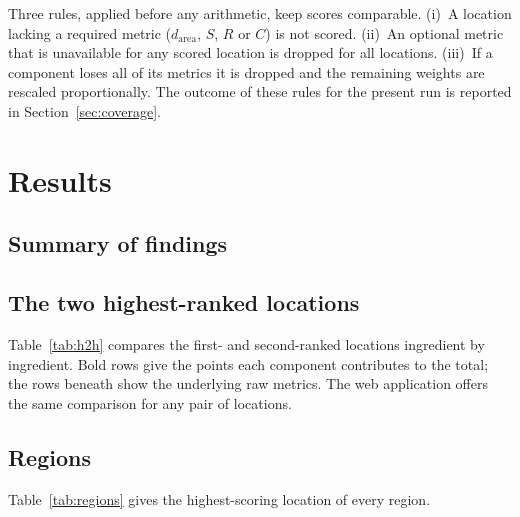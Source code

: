 \documentclass[11pt,a4paper]{article}
\begin{document}
Three rules, applied before any arithmetic, keep scores comparable. (i)~A location lacking a required
metric ($d_{\text{area}}$, $S$, $R$ or $C$) is not scored. (ii)~An optional metric that is unavailable for
any scored location is dropped for all locations. (iii)~If a component loses all of its metrics it is
dropped and the remaining weights are rescaled proportionally. The outcome of these rules for the present
run is reported in Section~\ref{sec:coverage}.

\section{Results}

\subsection{Summary of findings}



\subsection{The two highest-ranked locations}

Table~\ref{tab:h2h} compares the first- and second-ranked locations ingredient by ingredient. Bold rows
give the points each component contributes to the total; the rows beneath show the underlying raw metrics.
The web application offers the same comparison for any pair of locations.

\begin{table}[ht]
\centering\small

\caption{The two highest-ranked locations, ingredient by ingredient (higher-scoring location first).}
\label{tab:h2h}
\end{table}

\subsection{Regions}

Table~\ref{tab:regions} gives the highest-scoring location of every region.

\begin{table}[ht]
\centering\small

\caption{Best location per region (regions in alphabetical order). \emph{Scored} is the number of scored
locations in the region; \emph{Rank} is the overall rank among all scored locations.}
\label{tab:regions}
\end{table}
\end{document}
